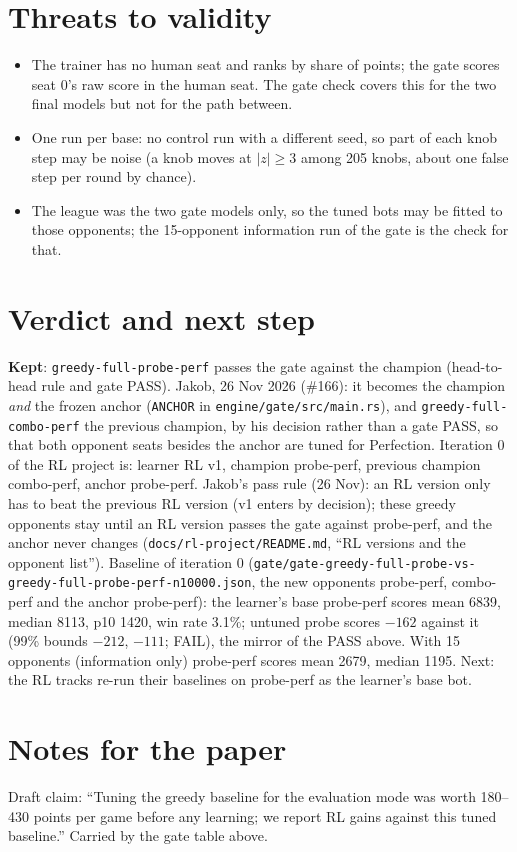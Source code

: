 \documentclass{../polyexp}
\begin{document}
\section{Threats to validity}
\begin{itemize}
\item The trainer has no human seat and ranks by share of points; the gate scores seat 0's raw score
  in the human seat. The gate check covers this for the two final models but not for the path between.
\item One run per base: no control run with a different seed, so part of each knob step may be noise
  (a knob moves at $|z| \ge 3$ among 205 knobs, about one false step per round by chance).
\item The league was the two gate models only, so the tuned bots may be fitted to those opponents; the
  15-opponent information run of the gate is the check for that.
\end{itemize}

\section{Verdict and next step}
\textbf{Kept}: \texttt{greedy-full-probe-perf} passes the gate against the champion (head-to-head rule
and gate PASS). Jakob, 26 Nov 2026 (\#166): it becomes the champion \emph{and} the frozen anchor
(\texttt{ANCHOR} in \texttt{engine/gate/src/main.rs}), and \texttt{greedy-full-combo-perf} the previous champion,
by his decision rather than a gate PASS, so that both opponent seats besides the anchor are tuned for
Perfection. Iteration 0 of the RL project is: learner RL v1, champion probe-perf, previous champion
combo-perf, anchor probe-perf. Jakob's pass rule (26 Nov): an RL version only has to beat the previous RL
version (v1 enters by decision); these greedy opponents stay until an RL version passes the gate against
probe-perf, and the anchor never changes (\texttt{docs/rl-project/README.md}, ``RL versions and the opponent list'').
Baseline of iteration 0 (\texttt{gate/gate-greedy-full-probe-vs-greedy-full-probe-perf-n10000.json}, the new
opponents probe-perf, combo-perf and the anchor probe-perf): the learner's base probe-perf scores mean 6839,
median 8113, p10 1420, win rate 3.1\%; untuned probe scores $-162$ against it (99\% bounds $-212$,
$-111$; FAIL), the mirror of the PASS above. With 15 opponents (information only) probe-perf scores mean
2679, median 1195. Next: the RL tracks re-run their baselines on probe-perf as the learner's base bot.

\section{Notes for the paper}
Draft claim: ``Tuning the greedy baseline for the evaluation mode was worth 180--430 points per game
before any learning; we report RL gains against this tuned baseline.'' Carried by the gate table above.
\end{document}

